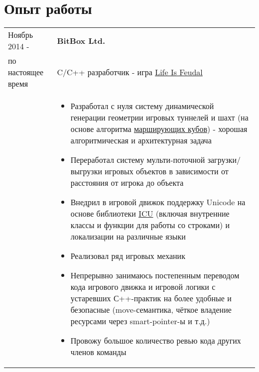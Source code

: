 \documentclass[a4paper, 11pt]{article}
\begin{document}
\section{Опыт работы}
\begin{longtable}{p{25mm}|p{110mm}}
    Ноябрь 2014 -       & \textbf{BitBox Ltd.}                                                        \\
    по настоящее время  & C/C++ разработчик - игра \href{http://lifeisfeudal.com/mmo}{Life Is Feudal} \\
                        &
    \begin{itemize}
        \item   Разработал с нуля систему динамической генерации геометрии
                игровых туннелей и шахт (на основе алгоритма
                \href{https://ru.wikipedia.org/wiki/Marching_cubes}{марширующих кубов})
                - хорошая алгоритмическая и архитектурная задача
        \item   Переработал систему мульти-поточной загрузки/выгрузки игровых
                объектов в зависимости от расстояния от игрока до объекта
        \item   Внедрил в игровой движок поддержку Unicode на основе библиотеки
                \href{http://site.icu-project.org/}{ICU} (включая внутренние
                классы и функции для работы со строками) и локализации на
                различные языки
        \item   Реализовал ряд игровых механик
        \item   Непрерывно занимаюсь постепенным переводом кода игрового движка
                и игровой логики с устаревших С++-практик на более удобные и
                безопасные (move-семантика, чёткое владение ресурсами через
                smart-pointer-ы и т.д.)
        \item   Провожу большое количество ревью кода других членов команды
    \end{itemize}                                                                   \\


\end{longtable}
\end{document}
